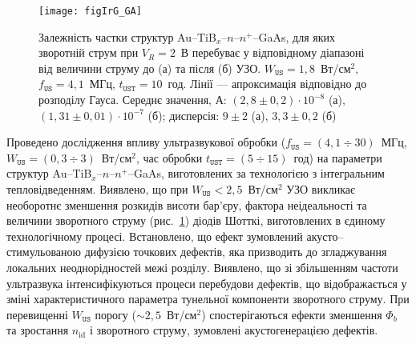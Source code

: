 \begin{figure}[b]
\center
\texttt{[image: figIrG\_GA]}%
\caption{\label{figIrG_GA}
Залежність частки структур Au--TiB$_x$--$n$--$n^+$--GaAs, для яких зворотній струм при $V_R=2$~В перебуває у відповідному діапазоні
від величини струму
до (а) та після (б) УЗО.
$W_\mathtt{US}=1,8$~Вт/см$^2$, $f_\mathtt{US}=4,1$~МГц, $t_\mathtt{UST}=10$~год.
Лінії --- апроксимація відповідно до розподілу Гауса.
Середнє значення, А:
$(2,8\pm0,2)\cdot10^{-8}$ (а),
$(1,31\pm0,01)\cdot10^{-7}$ (б);
дисперсія:
$9\pm2$ (а),
$3,3\pm0,2$ (б)
}
\end{figure}


Проведено дослідження впливу ультразвукової обробки
($f_\mathtt{US}=(4,1\div30)$~МГц, $W_\mathtt{US}=(0,3\div3)$~Вт/см$^2$, час обробки $t_\mathtt{UST}=(5\div15)$~год) на параметри структур
Au--TiB$_x$--$n$--$n^+$--GaAs, виготовлених
за технологією з інтегральним тепловідведенням.
Виявлено, що при $W_\mathtt{US}<2,5$~Вт/см$^2$ УЗО викликає необоротнє зменшення розкидів висоти бар'єру, фактора неідеальності та величини зворотного струму (рис.~\ref{figIrG_GA})
діодів Шотткі, виготовлених в єдиному технологічному процесі.
Встановлено, що ефект зумовлений акусто--стимульованою дифузією точкових дефектів, яка призводить до згладжування локальних неоднорідностей межі розділу.
Виявлено, що зі збільшенням частоти ультразвука інтенсифікуються процеси перебудови дефектів, що відображається у зміні характеристичного  параметра тунельної компоненти зворотного
струму.
При перевищенні $W_\mathtt{US}$ порогу ($\sim2,5$~Вт/см$^2$) спостерігаються ефекти зменшення $\Phi_b$ та зростання $n_\mathrm{id}$ і зворотного струму,
зумовлені акустогенерацією дефектів.



